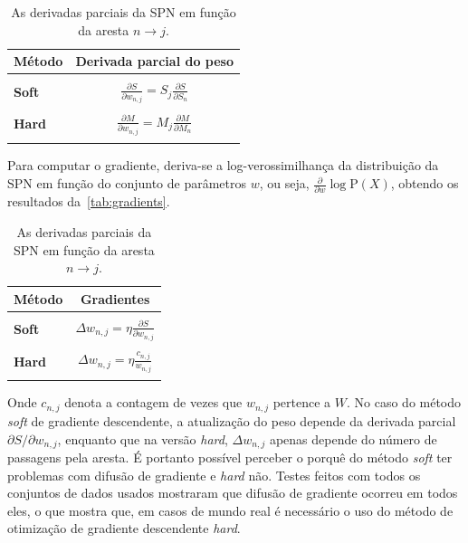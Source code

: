 \documentclass[12pt]{article}
\theoremstyle{plain}
\numberwithin{equation}{section}
\newcommand{\pr}{\text{P}}
\newcommand{\ddspn}[2]{\frac{\partial#1}{\partial#2}}
\newcommand{\iddspn}[2]{\partial#1/\partial#2}
\begin{document}
\begin{table}[h]
  \centering
  \begin{tabular}{l|c}
    \hline
    \multicolumn{1}{c}{\bfseries Método} & \multicolumn{1}{c}{\bfseries Derivada parcial do peso}\\
    \hline & \\
    \textbf{Soft} & \(\displaystyle \ddspn{S}{w_{n,j}} = S_j\ddspn{S}{S_n} \) \\
    & \\
    \textbf{Hard} & \(\displaystyle \ddspn{M}{w_{n,j}} = M_j\ddspn{M}{M_n} \) \\
    & \\
    \hline
  \end{tabular}
  \caption{\label{tab:derivative-weight} As derivadas parciais da SPN em função da aresta $n\to j$.}
\end{table}

Para computar o gradiente, deriva-se a log-verossimilhança da distribuição da SPN em função do
conjunto de parâmetros $w$, ou seja, $\ddspn{}{w}\log\pr(X)$, obtendo os resultados
da~\autoref{tab:gradients}.

\begin{table}[H]
  \centering
  \begin{tabular}{l|c}
    \hline
    \multicolumn{1}{c}{\bfseries Método} & \multicolumn{1}{c}{\bfseries Gradientes}\\
    \hline & \\
    \textbf{Soft} & \(\displaystyle \Delta w_{n,j} = \eta\ddspn{S}{w_{n,j}} \) \\
    & \\
    \textbf{Hard} & \(\displaystyle \Delta w_{n,j} = \eta \frac{c_{n,j}}{w_{n,j}} \) \\
    & \\
    \hline
  \end{tabular}
  \caption{\label{tab:gradients} As derivadas parciais da SPN em função da aresta $n\to j$.}
\end{table}

Onde $c_{n,j}$ denota a contagem de vezes que $w_{n,j}$ pertence a $W$. No caso do método
\textit{soft} de gradiente descendente, a atualização do peso depende da derivada parcial
$\iddspn{S}{w_{n,j}}$, enquanto que na versão \textit{hard}, $\Delta w_{n,j}$ apenas depende do
número de passagens pela aresta. É portanto possível perceber o porquê do método \textit{soft}
ter problemas com difusão de gradiente e \textit{hard} não. Testes feitos com todos os conjuntos de
dados usados mostraram que difusão de gradiente ocorreu em todos eles, o que mostra que, em
casos de mundo real é necessário o uso do método de otimização de gradiente descendente
\textit{hard}.
\end{document}
